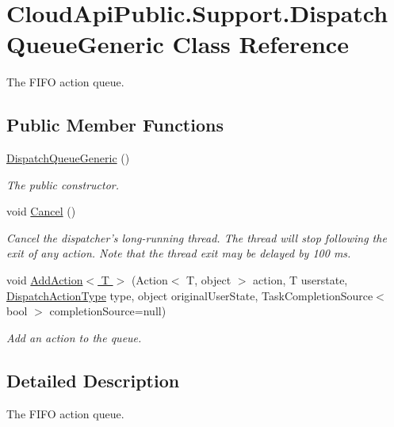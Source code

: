\hypertarget{class_cloud_api_public_1_1_support_1_1_dispatch_queue_generic}{\section{Cloud\-Api\-Public.\-Support.\-Dispatch\-Queue\-Generic Class Reference}
\label{class_cloud_api_public_1_1_support_1_1_dispatch_queue_generic}
}


The F\-I\-F\-O action queue.  


\subsection*{Public Member Functions}
\begin{DoxyCompactItemize}
\item 
\hyperlink{class_cloud_api_public_1_1_support_1_1_dispatch_queue_generic_a5edf9c1a8e9f42efe192f681a013e4c4}{Dispatch\-Queue\-Generic} ()
\begin{DoxyCompactList}\small\item\em The public constructor. \end{DoxyCompactList}\item 
void \hyperlink{class_cloud_api_public_1_1_support_1_1_dispatch_queue_generic_ace26654101b58f9d28b25785071ddb09}{Cancel} ()
\begin{DoxyCompactList}\small\item\em Cancel the dispatcher's long-\/running thread. The thread will stop following the exit of any action. Note that the thread exit may be delayed by 100 ms. \end{DoxyCompactList}\item 
void \hyperlink{class_cloud_api_public_1_1_support_1_1_dispatch_queue_generic_abb9f06d9f58d25ef3c24b1502b82946f}{Add\-Action$<$ T $>$} (Action$<$ T, object $>$ action, T userstate, \hyperlink{namespace_cloud_api_public_1_1_support_ae4ed3cc109410edb339c363c77eb4117}{Dispatch\-Action\-Type} type, object original\-User\-State, Task\-Completion\-Source$<$ bool $>$ completion\-Source=null)
\begin{DoxyCompactList}\small\item\em Add an action to the queue. \end{DoxyCompactList}\end{DoxyCompactItemize}


\subsection{Detailed Description}
The F\-I\-F\-O action queue. 



